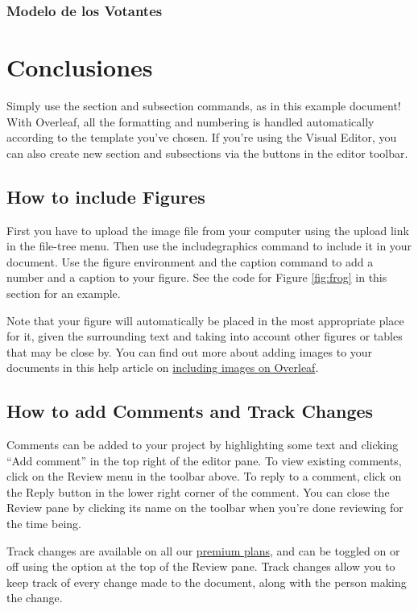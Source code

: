 \documentclass{article}
\begin{document}
\subsubsection{Modelo de los Votantes }


\section{Conclusiones}

Simply use the section and subsection commands, as in this example document! With Overleaf, all the formatting and numbering is handled automatically according to the template you've chosen. If you're using the Visual Editor, you can also create new section and subsections via the buttons in the editor toolbar.

\subsection{How to include Figures}

First you have to upload the image file from your computer using the upload link in the file-tree menu. Then use the includegraphics command to include it in your document. Use the figure environment and the caption command to add a number and a caption to your figure. See the code for Figure \ref{fig:frog} in this section for an example.

Note that your figure will automatically be placed in the most appropriate place for it, given the surrounding text and taking into account other figures or tables that may be close by. You can find out more about adding images to your documents in this help article on \href{https://www.overleaf.com/learn/how-to/Including_images_on_Overleaf}{including images on Overleaf}.



\subsection{How to add Comments and Track Changes}

Comments can be added to your project by highlighting some text and clicking ``Add comment'' in the top right of the editor pane. To view existing comments, click on the Review menu in the toolbar above. To reply to a comment, click on the Reply button in the lower right corner of the comment. You can close the Review pane by clicking its name on the toolbar when you're done reviewing for the time being.

Track changes are available on all our \href{https://www.overleaf.com/user/subscription/plans}{premium plans}, and can be toggled on or off using the option at the top of the Review pane. Track changes allow you to keep track of every change made to the document, along with the person making the change.
\end{document}
